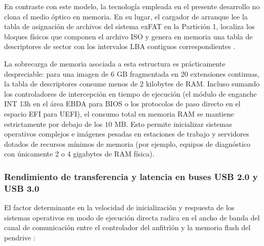 \documentclass[12pt]{article}
\begin{document}
En contraste con este modelo, la tecnología empleada en el presente desarrollo no clona el medio óptico en memoria. En su lugar, el cargador de arranque lee la tabla de asignación de archivos del sistema exFAT en la Partición 1, localiza los bloques físicos que componen el archivo ISO y genera en memoria una tabla de descriptores de sector con los intervalos LBA contiguos correspondientes \parencite{ventoy2024documentation}.

La sobrecarga de memoria asociada a esta estructura es prácticamente despreciable: para una imagen de $6\text{ GB}$ fragmentada en 20 extensiones continuas, la tabla de descriptores consume menos de 2 kilobytes de RAM. Incluso sumando los controladores de intercepción en tiempo de ejecución (el módulo de enganche INT 13h en el área EBDA para BIOS o los protocolos de paso directo en el espacio EFI para UEFI), el consumo total en memoria RAM se mantiene estrictamente por debajo de los $10\text{ MB}$. Esto permite inicializar sistemas operativos complejos e imágenes pesadas en estaciones de trabajo y servidores dotados de recursos mínimos de memoria (por ejemplo, equipos de diagnóstico con únicamente 2 o 4 gigabytes de RAM física).

\subsubsection{Rendimiento de transferencia y latencia en buses USB 2.0 y USB 3.0}

El factor determinante en la velocidad de inicialización y respuesta de los sistemas operativos en modo de ejecución directa radica en el ancho de banda del canal de comunicación entre el controlador del anfitrión y la memoria flash del pendrive \parencite[\S11.2, p.\ 500]{stallings2018operating}:
\end{document}
